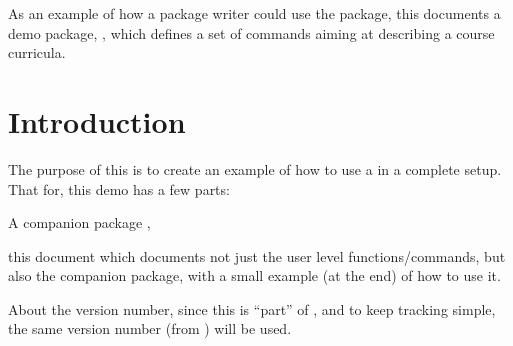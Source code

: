 \documentclass[10pt]{article}
\begin{document}










 



\begin{tsabstract}
  As an example of how a package writer could use the  package, this documents a demo package, , which defines a set of commands aiming at describing a course curricula.
\end{tsabstract}

\tableofcontents

\section{Introduction}
The purpose of this is to create an example of how to use a  in a complete setup. That for, this demo has a few parts:
\begin{enumerate*}
  \item A companion package ,
  \item this document which documents not just the user level functions/commands, but also the companion package, with  a small example (at the end) of how to use it.
\end{enumerate*}
\begin{tsremark}
  About the version number, since this is ``part'' of , and to keep tracking simple, the same version number (from ) will be used.
\end{tsremark}
\end{document}
